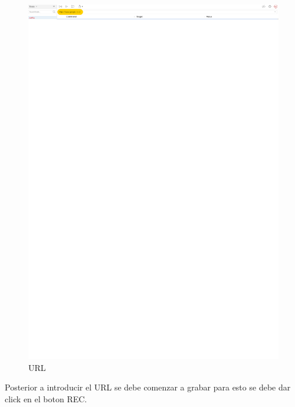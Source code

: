 \documentclass[conference]{IEEEtran}
\begin{document}
\begin{figure}[H]
\centering
\includegraphics[scale=0.47]{imagenes/18.pdf}
\caption{URL}
\end{figure}

Posterior a introducir el URL se debe comenzar a grabar para esto se debe dar click en el boton REC.
\end{document}
